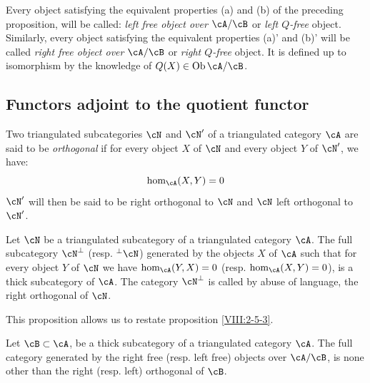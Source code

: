 \begin{definition}\label{VIII:2-5-4}
Every object satisfying the equivalent properties (a) and (b) of the
preceding proposition, will be called: \emph{left free object over
$\cA/\cB$} or \emph{left $Q$-free} object. Similarly, every
object satisfying the equivalent properties (a)' and (b)' will be called
\emph{right free object over $\cA/\cB$} or
\emph{right $Q$-free} object. It is defined up to isomorphism by the
knowledge of $Q(X)\in\operatorname{Ob}{\cA/\cB}$.
\end{definition}





\subsection{Functors adjoint to the quotient functor}\label{VIII:2-6}





\begin{definition}\label{VIII:2-6-1}
Two triangulated subcategories $\cN$ and $\cN'$ of a
triangulated category $\cA$ are said to be \emph{orthogonal} if for every object $X$ of
$\cN$ and every object $Y$ of $\cN'$, we have:
\[
  \hom_\cA(X,Y) = 0
\]
$\cN'$ will then be said to be right orthogonal to $\cN$ and $\cN$ left
orthogonal to $\cN'$.
\end{definition}





\begin{proposition}\label{VIII:2-6-2}
Let $\cN$ be a triangulated subcategory of a triangulated category
$\cA$. The full subcategory $\cN^\bot$ (resp. $^\bot\cN$) generated by the
objects $X$ of $\cA$ such that for every object $Y$ of $\cN$ we have
$\hom_\cA(Y,X)=0$ (resp. $\hom_\cA(X,Y)=0$), is a thick subcategory
of $\cA$. The category $\cN^\bot$ is called by abuse of language,
the right orthogonal of $\cN$.
\end{proposition}

This proposition allows us to restate proposition \ref{VIII:2-5-3}. 





\begin{proposition}\label{VIII:2-6-3}
Let $\cB\subset\cA$, be a thick subcategory of a
triangulated category $\cA$. The full category generated by the right free
(resp. left free) objects over $\cA/\cB$, is none other than the right
(resp. left) orthogonal of $\cB$. 
\end{proposition}





